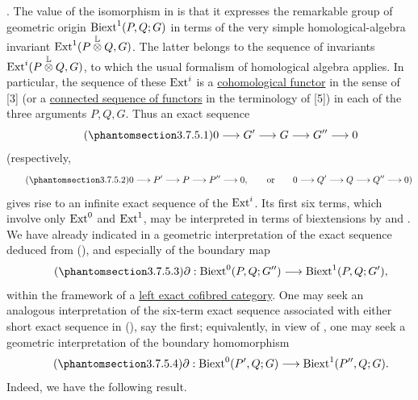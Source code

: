 . The value of the isomorphism in  is that it expresses the
remarkable group of geometric origin $\operatorname{Biext}^1(P,Q;G)$ in terms of
the very simple homological-algebra invariant
$\operatorname{Ext}^1(P\mathbin{\overset{\mathbb L}{\otimes}}Q,G)$.  The latter
belongs to the sequence of invariants
$\operatorname{Ext}^i(P\mathbin{\overset{\mathbb L}{\otimes}}Q,G)$, to which the
usual formalism of homological algebra applies.  In particular, the
sequence of these $\operatorname{Ext}^i$ is a \underline{cohomological functor} in
the sense of [3] (or a \underline{connected sequence of functors} in
the terminology of [5]) in each of the three arguments $P,Q,G$.
Thus an exact sequence
\begin{equation}\tag{\SGARefTarget{sga7.sga7i.evii.n3-7-5-1}{3.7.5.1}}
 0\longrightarrow G'\longrightarrow G\longrightarrow G''
 \longrightarrow0
\end{equation}
(respectively,
\begin{equation}\tag{\SGARefTarget{sga7.sga7i.evii.n3-7-5-2}{3.7.5.2}}
 0\longrightarrow P'\longrightarrow P\longrightarrow P''
 \longrightarrow0,\qquad\text{or}\qquad
 0\longrightarrow Q'\longrightarrow Q\longrightarrow Q''
 \longrightarrow0)
\end{equation}
gives rise to an infinite exact sequence of the $\operatorname{Ext}^i$.  Its first
six terms, which involve only $\operatorname{Ext}^0$ and $\operatorname{Ext}^1$, may be
interpreted in terms of biextensions by  and .  We have
already indicated in  a geometric interpretation of the exact
sequence deduced from (), and especially of the boundary map
\begin{equation}\tag{\SGARefTarget{sga7.sga7i.evii.n3-7-5-3}{3.7.5.3}}
 \partial:\Biext^0(P,Q;G'')\longrightarrow
 \Biext^1(P,Q;G'),
\end{equation}
within the framework of a \underline{left exact cofibred category}.
One may seek an analogous interpretation of the six-term exact
sequence associated with either short exact sequence in (),
say the first; equivalently, in view of , one may seek a
geometric interpretation of the boundary homomorphism
\begin{equation}\tag{\SGARefTarget{sga7.sga7i.evii.n3-7-5-4}{3.7.5.4}}
 \partial:\Biext^0(P',Q;G)\longrightarrow
 \Biext^1(P'',Q;G).
\end{equation}
Indeed, we have the following result.


